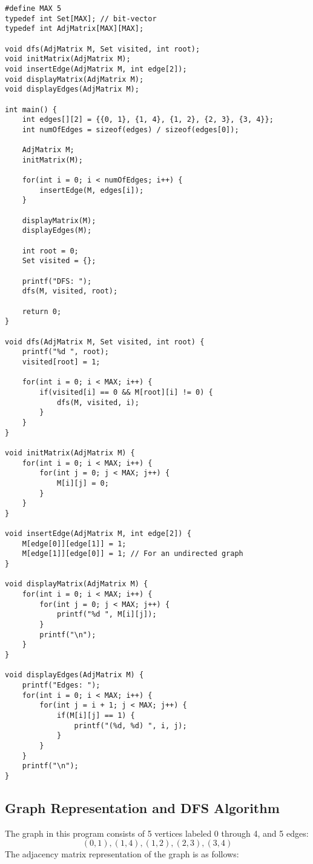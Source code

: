 \documentclass{book}
\begin{document}
\begin{verbatim}
#define MAX 5
typedef int Set[MAX]; // bit-vector
typedef int AdjMatrix[MAX][MAX];

void dfs(AdjMatrix M, Set visited, int root);
void initMatrix(AdjMatrix M);
void insertEdge(AdjMatrix M, int edge[2]);
void displayMatrix(AdjMatrix M);
void displayEdges(AdjMatrix M);

int main() {
    int edges[][2] = {{0, 1}, {1, 4}, {1, 2}, {2, 3}, {3, 4}};
    int numOfEdges = sizeof(edges) / sizeof(edges[0]);
    
    AdjMatrix M;
    initMatrix(M);

    for(int i = 0; i < numOfEdges; i++) {
        insertEdge(M, edges[i]);
    }

    displayMatrix(M);
    displayEdges(M);

    int root = 0;
    Set visited = {};

    printf("DFS: ");
    dfs(M, visited, root);

    return 0;
}

void dfs(AdjMatrix M, Set visited, int root) {
    printf("%d ", root);
    visited[root] = 1;

    for(int i = 0; i < MAX; i++) {
        if(visited[i] == 0 && M[root][i] != 0) {
            dfs(M, visited, i);
        }
    }
}

void initMatrix(AdjMatrix M) {
    for(int i = 0; i < MAX; i++) {
        for(int j = 0; j < MAX; j++) {
            M[i][j] = 0;
        }
    }
}

void insertEdge(AdjMatrix M, int edge[2]) {
    M[edge[0]][edge[1]] = 1;
    M[edge[1]][edge[0]] = 1; // For an undirected graph
}

void displayMatrix(AdjMatrix M) {
    for(int i = 0; i < MAX; i++) {
        for(int j = 0; j < MAX; j++) {
            printf("%d ", M[i][j]);
        }
        printf("\n");
    }
}

void displayEdges(AdjMatrix M) {
    printf("Edges: ");
    for(int i = 0; i < MAX; i++) {
        for(int j = i + 1; j < MAX; j++) {
            if(M[i][j] == 1) {
                printf("(%d, %d) ", i, j);
            }
        }
    }
    printf("\n");
}
\end{verbatim}

\subsection{Graph Representation and DFS Algorithm}

The graph in this program consists of 5 vertices labeled 0 through 4, and 5 edges:
\[
(0, 1), (1, 4), (1, 2), (2, 3), (3, 4)
\]
The adjacency matrix representation of the graph is as follows:
\end{document}
